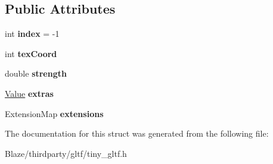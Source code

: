 \subsection*{Public Attributes}
\begin{DoxyCompactItemize}
\item 
\mbox{\label{structtinygltf_1_1OcclusionTextureInfo_a5cba20d13438aeee560cb1f24247692a}} 
int {\bfseries index} = -\/1
\item 
\mbox{\label{structtinygltf_1_1OcclusionTextureInfo_a329aaab28b779602229cb1c933046df7}} 
int {\bfseries tex\+Coord}
\item 
\mbox{\label{structtinygltf_1_1OcclusionTextureInfo_aa12debd08988f2d513d3d5d56bd60ae8}} 
double {\bfseries strength}
\item 
\mbox{\label{structtinygltf_1_1OcclusionTextureInfo_a9dd488c81d61ee9a670ebdb01296451f}} 
\hyperlink{classtinygltf_1_1Value}{Value} {\bfseries extras}
\item 
\mbox{\label{structtinygltf_1_1OcclusionTextureInfo_a3dc07432347b6bf67c1a5e39b86ed609}} 
Extension\+Map {\bfseries extensions}
\end{DoxyCompactItemize}


The documentation for this struct was generated from the following file\+:\begin{DoxyCompactItemize}
\item 
Blaze/thirdparty/gltf/tiny\+\_\+gltf.\+h\end{DoxyCompactItemize}
